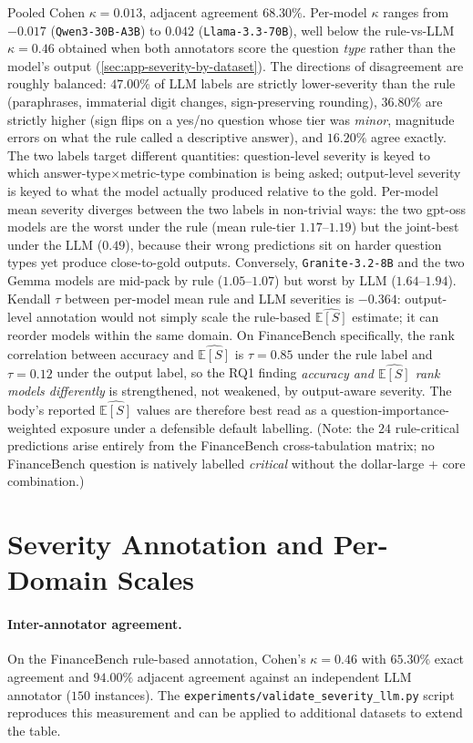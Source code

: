 \documentclass[11pt]{article}
\newcommand{\ES}{\mathbb{E}[S]}
\begin{document}
\noindent Pooled Cohen $\kappa = 0.013$, adjacent agreement
$68.30\%$. Per-model $\kappa$ ranges from $-0.017$ (\texttt{Qwen3-30B-A3B})
to $0.042$ (\texttt{Llama-3.3-70B}), well below the rule-vs-LLM
$\kappa = 0.46$ obtained when both annotators score the question
\emph{type} rather than the model's output
(\autoref{sec:app-severity-by-dataset}). The directions of
disagreement are roughly balanced: $47.00\%$ of LLM labels are
strictly lower-severity than the rule (paraphrases, immaterial
digit changes, sign-preserving rounding), $36.80\%$ are
strictly higher (sign flips on a yes/no question whose tier was
\emph{minor}, magnitude errors on what the rule called a
descriptive answer), and $16.20\%$ agree exactly. The two labels
target different quantities: question-level severity is keyed to
which answer-type$\times$metric-type combination is being
asked; output-level severity is keyed to what the model
actually produced relative to the gold. Per-model mean severity
diverges between the two labels in non-trivial ways: the two
gpt-oss models are the worst under the rule (mean rule-tier
$1.17$--$1.19$) but the joint-best under the LLM ($0.49$),
because their wrong predictions sit on harder question types yet
produce close-to-gold outputs. Conversely, \texttt{Granite-3.2-8B} and
the two Gemma models are mid-pack by rule ($1.05$--$1.07$) but
worst by LLM ($1.64$--$1.94$). Kendall $\tau$ between per-model
mean rule and LLM severities is $-0.364$: output-level
annotation would not simply scale the rule-based $\widehat{\ES}$
estimate; it can reorder models within the same domain. On
FinanceBench specifically, the rank correlation between accuracy
and $\widehat{\ES}$ is $\tau = 0.85$ under the rule label and
$\tau = 0.12$ under the output label, so the RQ1 finding
\emph{accuracy and $\widehat{\ES}$ rank models differently} is
strengthened, not weakened, by output-aware severity. The body's
reported $\widehat{\ES}$ values are therefore best read as a
question-importance-weighted exposure under a defensible default
labelling. (Note: the $24$ rule-critical predictions
arise entirely from the FinanceBench cross-tabulation matrix;
no FinanceBench question is natively labelled \emph{critical}
without the dollar-large + core combination.)

\section{Severity Annotation and Per-Domain Scales}
\label{sec:app-severity-by-dataset}

\paragraph{Inter-annotator agreement.}
On the FinanceBench rule-based annotation, Cohen's
$\kappa = 0.46$ with $65.30\%$ exact agreement and $94.00\%$
adjacent agreement against an independent LLM annotator ($150$
instances). The \texttt{experiments/validate\_severity\_llm.py}
script reproduces this measurement and can be applied to
additional datasets to extend the table.
\end{document}
